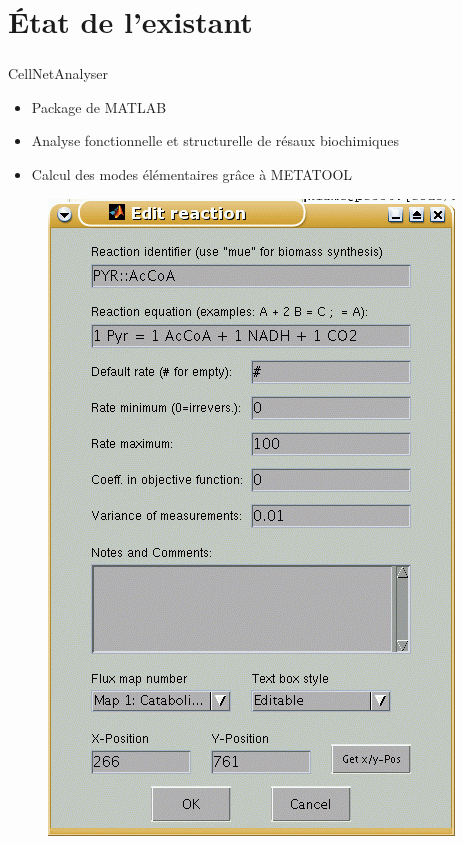 \documentclass[11pt]{beamer}
\begin{document}
\section{État de l'existant}			

\begin{frame}
	\frametitle{\secname}
	\begin{minipage}{5cm}
	\begin{block}{CellNetAnalyser}
	\begin{itemize}
	\item Package de MATLAB
	\item Analyse fonctionnelle et structurelle de résaux biochimiques
	\item Calcul des modes élémentaires grâce à METATOOL
	\end{itemize}
	\end{block}
	\end{minipage}
	\begin{minipage}{5cm}
	\begin{center}
	\begin{figure}[h]
	\includegraphics[scale=0.3]{cellnet.png}
		
	\end{figure}
	\end{center}
	\end{minipage}
		
\end{frame}
\end{document}
